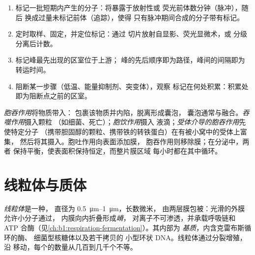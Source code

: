 \begin{method}[追踪分子在细胞中的路径]\label{met:b1:eukaryotic-cell:pulsechase}
\begin{enumerate}
  \item 标记一批短期内产生的分子：将暴露于放射性或
        荧光前体数分钟（脉冲），随后
        换成过量未标记前体（追踪），使得
        只有脉冲期间合成的分子带有标记。
  \item 定时取样、固定，并定位标记：通过
        切片放射自显影、荧光显微术，或
        分级分离后计数。
  \item 标记峰最先出现的区室位于上游；
        峰的先后顺序即为路径，峰间的间隔即为
        转运时间。
  \item 阻断某一步骤（低温、能量抑制剂、突变体），观察
        标记在何处积累：积累处即为阻断点之前的区室。
\end{enumerate}
\end{method}

\begin{definition}[胞吞作用]\label{def:b1:eukaryotic-cell:endocytosis}
\emph{胞吞作用}将物质带入：
包裹该物质并内陷，脱离形成囊泡，
囊泡通常与融合。\emph{吞噬作用}摄入颗粒
（如细菌、死亡）；\emph{胞饮作用}摄入
液滴；\emph{受体介导的胞吞作用}先使特定分子
（携带胆固醇的颗粒、携带铁的转铁蛋白）在有被小窝中的受体上富集，
然后将其摄入。胞吐作用向表面添加膜，
胞吞作用则移除膜；在分泌中，两者
保持平衡，使表面积保持恒定，而整片膜区域
每小时都在其中循环。
\end{definition}

\section{线粒体与质体}

\begin{definition}[线粒体]\label{def:b1:eukaryotic-cell:mitochondrion}
\emph{线粒体}是一种，
直径为 \qtyrange{0.5}{1}{\micro m}，长数微米，
由两层膜包被：光滑的外膜允许小分子通过，
内膜向内折叠形成\emph{嵴}，
对离子不可渗透，并承载呼吸链和 ATP
合酶（见\cref{ch:b1:respiration-fermentation}）。其内部为
\emph{基质}，内含克雷布斯循环的酶、
细菌型核糖体以及若干拷贝的
小型环状 DNA。线粒体通过分裂增殖，沿
移动，每个的数量从几百到几千个不等。
\end{definition}

